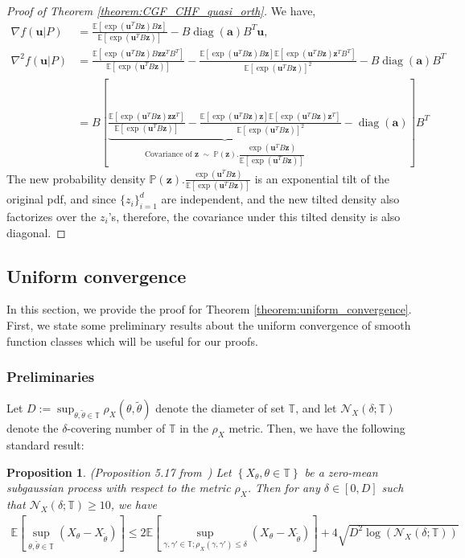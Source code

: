 \documentclass[letterpaper]{article}
\newtheorem{proposition}[theorem]{Proposition}
\newcommand{\bas}[1]{\begin{align*}#1\end{align*}}
\newcommand{\bu}{\pmb{u}}
\newcommand{\bz}{\pmb{z}}
\newcommand{\bvar}{\pmb{a}}
\newcommand{\E}{\mathbb{E}}
\newcommand{\bb}[1]{\left(#1\right)}
\newcommand{\bbb}[1]{\left[#1\right]}
\DeclareMathOperator{\diag}{diag}
\begin{document}
\begin{proof}[Proof of Theorem \ref{theorem:CGF_CHF_quasi_orth}]
We have, 
\bas{
    \nabla f\bb{\bu|P} &= \frac{\mathbb{E}\bbb{\exp\bb{\bu^{T}B\bz}B\bz}}{\mathbb{E}\bbb{\exp\bb{\bu^{T}B\bz}}} - B\diag\bb{\bvar}B^{T}\bu, \\ 
    \nabla^{2} f\bb{\bu|P} &= \frac{\mathbb{E}\bbb{\exp\bb{\bu^{T}B\bz}B\bz \bz^{T}B^{T}}}{\mathbb{E}\bbb{\exp\bb{\bu^{T}B\bz}}} - \frac{\mathbb{E}\bbb{\exp\bb{\bu^{T}B\bz}B\bz}\mathbb{E}\bbb{\exp\bb{\bu^{T}B\bz}\bz^{T}B^{T}}}{\mathbb{E}\bbb{\exp\bb{\bu^{T}B\bz}}^{2}} - B\diag\bb{\bvar}B^{T} \\ 
    &= B\bbb{\underbrace{\frac{\mathbb{E}\bbb{\exp\bb{\bu^{T}B\bz}\bz\bz^{T}}}{\mathbb{E}\bbb{\exp\bb{\bu^{T}B\bz}}} - \frac{\mathbb{E}\bbb{\exp\bb{\bu^{T}B\bz}\bz}\mathbb{E}\bbb{\exp\bb{\bu^{T}B\bz}\bz^{T}}}{\mathbb{E}\bbb{\exp\bb{\bu^{T}B\bz}}^{2}}}_{\text{Covariance of } \bz \; \sim \; \mathbb{P}\bb{\bz}.\dfrac{\exp\bb{\bu^{T}B\bz}}{\mathbb{E}\bbb{\exp\bb{\bu^{T}B\bz}}}} - \diag\bb{\bvar}}B^{T}
}
The new probability density $\mathbb{P}\bb{\bz}.\frac{\exp\bb{\bu^{T}B\bz}}{\mathbb{E}\bbb{\exp\bb{\bu^{T}B\bz}}}$ is an exponential tilt of the original pdf, and since $\{z_{i}\}_{i=1}^{d}$ are independent, and the new tilted density also factorizes over the $z_{i}$'s, therefore, the covariance under this tilted density is also diagonal.
\end{proof}

\subsection{Uniform convergence}
\label{subsection:ica_uniform_convergence}
In this section, we provide the proof for Theorem \ref{theorem:uniform_convergence}. First, we state some preliminary results about the uniform convergence of smooth function classes which will be useful for our proofs.

\subsubsection{Preliminaries}
Let $D := \sup_{\theta, \tilde{\theta} \in \mathbb{T}}\rho_{X}\bb{\theta, \tilde{\theta}}$ denote the diameter of set $\mathbb{T}$, and let $\mathcal{N}_{X}\bb{\delta; \mathbb{T}}$ denote the $\delta$-covering number of $\mathbb{T}$ in the $\rho_{X}$ metric. Then, we have the following standard result:
\begin{proposition} \label{proposition:one_step_discretization} (Proposition 5.17 from~\cite{wainwright2019high}) Let $\left\{X_{\theta}, \theta \in \mathbb{T}\right\}$ be a zero-mean subgaussian process with respect to the metric $\rho_{X}$. Then for any $\delta \in \bbb{0,D}$ such that $\mathcal{N}_{X}\bb{\delta; \mathbb{T}} \geq 10$, we have
\bas{
    \E\bbb{\sup_{\theta, \tilde{\theta} \in \mathbb{T}}\bb{X_{\theta}-X_{\tilde{\theta}}}} \leq 2\E\bbb{\sup_{\gamma, \gamma' \in \mathbb{T}; \rho_{X}\bb{\gamma,\gamma'} \leq \delta}\bb{X_{\theta}-X_{\tilde{\theta}}}} + 4\sqrt{D^{2}\log\bb{\mathcal{N}_{X}\bb{\delta; \mathbb{T}}}}
}
\end{proposition}
\end{document}

